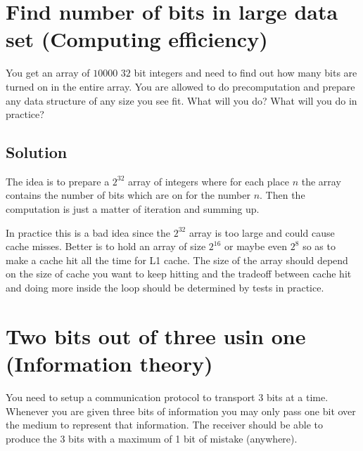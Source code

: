 \documentclass{article}
\begin{document}
\section {Find number of bits in large data set (Computing efficiency)}
You get an array of $10000$ $32$ bit integers and need to find out how many bits are turned on in the entire array.
You are allowed to do precomputation and prepare any data structure of any size you see fit. What will you do? What will you do in practice?

\subsection{Solution}
The idea is to prepare a $2^{32}$ array of integers where for each place $n$ the array contains the number of bits which are on for the number $n$. Then the computation is just a matter of iteration and summing up.

In practice this is a bad idea since the $2^{32}$ array is too large and could cause cache misses. Better is to hold an array of size $2^{16}$ or maybe even $2^{8}$ so as to make a cache hit all the time for L1 cache. The size of the array should depend on the size of cache you want to keep hitting and the tradeoff between cache hit and doing more inside the loop should be determined by tests in practice.

\section {Two bits out of three usin one (Information theory)}
You need to setup a communication protocol to transport $3$ bits at a time. Whenever you are given three bits of information you may only pass one bit over the medium to represent that information. The receiver should be able to produce the $3$ bits with a maximum of 1 bit of mistake (anywhere).
\end{document}
